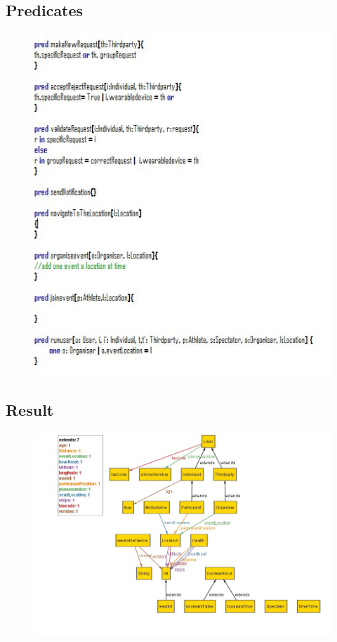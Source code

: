 \subsection{Predicates}
\begin{figure}[H]	\includegraphics[width=\linewidth]{./Alloy/Pred.JPG}
\end{figure}
\subsection{Result}
\begin{figure}[H]	\includegraphics[width=\linewidth]{./Alloy/Meta_.JPG}
\end{figure}